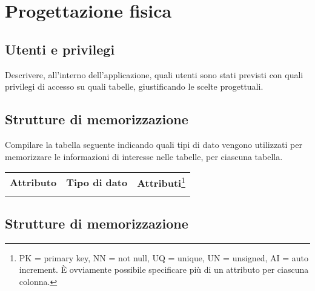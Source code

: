 \section{Progettazione fisica}

\subsection*{Utenti e privilegi}

\begin{templateblock}
    Descrivere, all’interno dell’applicazione, quali utenti sono stati previsti
    con quali privilegi di accesso su quali tabelle, giustificando le scelte
    progettuali.
\end{templateblock}

\subsection*{Strutture di memorizzazione}

\begin{templateblock}
    Compilare la tabella seguente indicando quali tipi di dato vengono
    utilizzati per memorizzare le informazioni di interesse nelle tabelle,
    per ciascuna tabella.
\end{templateblock}

\begin{tabularx}{\linewidth}{|Y|Y|Y|}
    \hline
                                                                                                                                                                                                \\\hline
    \textbf{Attributo} & \textbf{Tipo di dato} & \textbf{Attributi}\footnote{PK = primary key, NN = not null, UQ = unique, UN = unsigned, AI = auto increment. È ovviamente possibile specificare più di un attributo per ciascuna colonna.} \\\hline
                       &                       &                                                                                                                                                                                             \\ \hline
\end{tabularx}

\subsection*{Strutture di memorizzazione}

